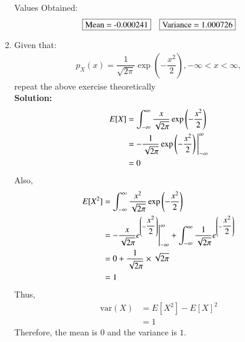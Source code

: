 \documentclass[journal,12pt,onecolumn]{IEEEtran}
\numberwithin{equation}{section}
\renewcommand\thesection{\arabic{section}}
\providecommand{\brak}[1]{\ensuremath{\left(#1\right)}}
\newcommand{\solution}{\noindent \textbf{Solution: }}
\begin{document}
\begin{enumerate}[label=\thesection.\arabic*,ref=\thesection.\theenumi]
\begin{lstlisting}
            \end{lstlisting}
          Values Obtained:
          \begin{align}
               & \fbox{Mean =  -0.000241}
               & \fbox{Variance = 1.000726}
          \end{align}
    \item Given that:
          \begin{align}
              p_{X}(x) = \dfrac{1}{\sqrt{2\pi}}\exp\brak{-\dfrac{x^2}{2}}, -\infty < x < \infty,
          \end{align}
          repeat the above exercise theoretically
          \\
          \solution
          \begin{align}
              E[X] & =  \int_{-\infty}^{\infty} \dfrac{x}{\sqrt{2\pi}}\exp{\left(-\dfrac{x^2}{2}\right)}
              \\
                   & = -\dfrac{1}{\sqrt{2\pi}}\exp\brak{-\dfrac{x^2}{2}} \Bigg{|}_{-\infty}^{\infty}
              \\
                   & = 0
          \end{align}
          Also,
          \begin{align}
              E[X^2] & =  \int_{-\infty}^{\infty} \dfrac{x^2}{\sqrt{2\pi}}\exp{\left(-\dfrac{x^2}{2}\right)}
              \\
                     & = -\dfrac{x}{\sqrt{2\pi}}e^{\brak{-\dfrac{x^2}{2}}} \Bigg{|}_{-\infty}^{\infty} + \int_{-\infty}^{\infty} \dfrac{1}{\sqrt{2\pi}}e^{\brak{-\dfrac{x^2}{2}}}
              \\
                     & = 0 + \dfrac{1}{\sqrt{2\pi}} \times \sqrt{2\pi}
              \\
                     & = 1
          \end{align}
          Thus,
          \begin{align}
              \text{var}(X) & = E[X^2] - E[X]^2 \\
                            & = 1
          \end{align}
          Therefore, the mean is $0$ and the variance is $1$.
\end{enumerate}
\end{document}
